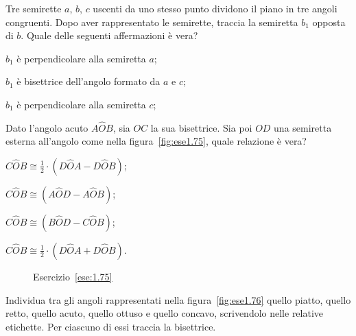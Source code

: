 \begin{esercizio}
Tre semirette \(a\), \(b\), \(c\) uscenti da uno stesso punto dividono il 
piano in tre angoli congruenti. Dopo aver rappresentato le semirette, 
traccia la semiretta \(b_1\) opposta di \(b\). Quale delle seguenti 
affermazioni è vera?
\begin{enumeratea}
\item \(b_1\) è perpendicolare alla semiretta \(a\);
\item \(b_1\) è bisettrice dell'angolo formato da \(a\) e \(c\);
\item \(b_1\) è perpendicolare alla semiretta \(c\);
\end{enumeratea}
\end{esercizio}

\begin{esercizio}
Dato l'angolo acuto \(A\widehat{O}B\), sia \(OC\) la sua bisettrice. Sia 
poi \(OD\) una semiretta esterna all'angolo come nella 
figura~\ref{fig:ese1.75}, quale relazione è vera?
\begin{multicols}{2}
\begin{enumeratea}
\item \(C\widehat{O}B\cong 
\frac{1}{2}\cdot(D\widehat{O}A-D\widehat{O}B)\);
\item \(C\widehat{O}B\cong (A\widehat{O}D-A\widehat{O}B)\);
\item \(C\widehat{O}B\cong (B\widehat{O}D-C\widehat{O}B)\);
\item \(C\widehat{O}B\cong 
\frac{1}{2}\cdot(D\widehat{O}A+D\widehat{O}B)\).
\end{enumeratea}
\end{multicols}
\end{esercizio}


\begin{inaccessibleblock}
 \begin{figure}[htb]
 \centering
 \caption{Esercizio~\ref{ese:1.75}}%
\end{figure}
\end{inaccessibleblock}

\begin{esercizio}
Individua tra gli angoli rappresentati nella figura~\ref{fig:ese1.76} 
quello piatto, quello retto, quello acuto, quello ottuso e quello 
concavo, scrivendolo nelle relative etichette. Per ciascuno di essi 
traccia la bisettrice.
\end{esercizio}


